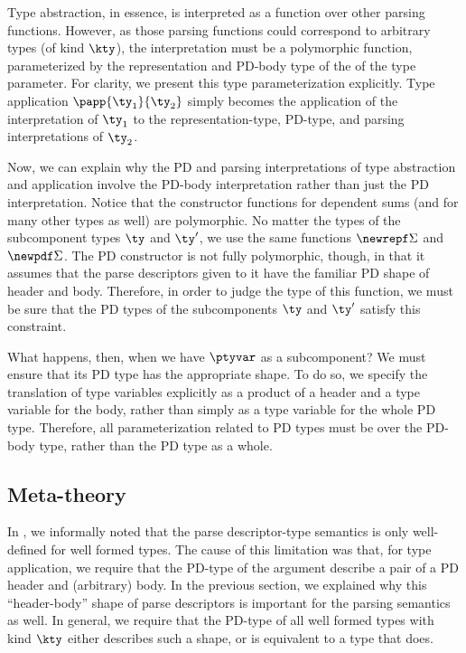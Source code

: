 Type abstraction, in essence, is interpreted as a function
over other parsing functions. However, as those parsing functions
could correspond to arbitrary \ddc{} types (of kind $\kty$), the
interpretation must be a polymorphic function, parameterized by the
representation and PD-body type of the of the \ddc{} type parameter.
For clarity, we present this type parameterization explicitly.  Type
application $\papp {\ty_1}{\ty_2}$ simply becomes the application of
the interpretation of $\ty_1$ to the representation-type, PD-type, and parsing
interpretations of $\ty_2$.

Now, we can explain why the PD and parsing interpretations
of type abstraction and application involve the PD-body interpretation
rather than just the PD interpretation. Notice that the constructor
functions for dependent sums (and for many other types as well) are
polymorphic. No matter the types of the subcomponent types $\ty$ and
$\ty'$, we use the same functions $\newrepf \Sigma$ and $\newpdf
\Sigma$. The PD constructor is not fully polymorphic, though, in that
it assumes that the parse descriptors given to it have the familiar PD
shape of header and body.  Therefore, in order to judge the type of
this function, we must be sure that the PD types of the subcomponents
$\ty$ and $\ty'$ satisfy this constraint.

What happens, then, when we have $\ptyvar$ as a subcomponent? We must
ensure that its PD type has the appropriate shape. To do so, we
specify the translation of type variables explicitly as a product of a
header and a type variable for the body, rather than simply as a type
variable for the whole PD type. Therefore, all parameterization
related to PD types must be over the PD-body type, rather than the PD
type as a whole.

\subsection{Meta-theory}
\label{sec:meta-theory}

In , we informally noted that the parse
descriptor-type semantics is only well-defined for well formed types.
The cause of this limitation was that, for type application, we
require that the PD-type of the argument describe a pair of a PD
header and (arbitrary) body. In the previous section, we explained why
this ``header-body'' shape of parse descriptors is important for the
parsing semantics as well. In general, we require that the PD-type of
all well formed types with kind $\kty$ either describes such a shape, or
is equivalent to a type that does.  

